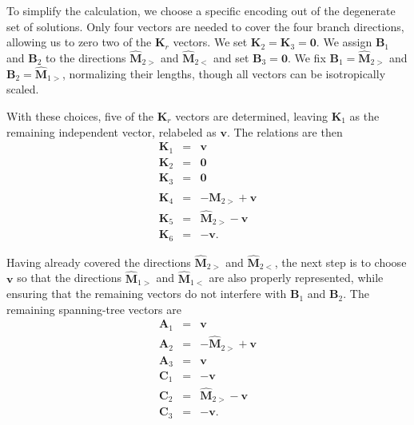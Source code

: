 \documentclass[%
reprint,
superscriptaddress,
amsmath,amssymb,
aps,
]{revtex4-2}
\begin{document}
\begin{onecolumngrid}
		To simplify the calculation, we choose a specific encoding out of the degenerate set of solutions. Only four vectors are needed to cover the four branch directions, allowing us to zero two of the $\mathbf{K}_r$ vectors. We set $\mathbf{K}_2 = \mathbf{K}_3 = \mathbf{0}$. We assign $\mathbf{B}_1$ and $\mathbf{B}_2$ to the directions $\hat{\mathbf{M}}_{2>}$ and $\hat{\mathbf{M}}_{2<}$ and set $\mathbf{B}_3 = \mathbf{0}$. We fix $\mathbf{B}_1 = \hat{\mathbf{M}}_{2>}$ and $\mathbf{B}_2 = \hat{\mathbf{M}}_{1>}$, normalizing their lengths, though all vectors can be isotropically scaled.
		
		With these choices, five of the $\mathbf{K}_r$ vectors are determined, leaving $\mathbf{K}_1$ as the remaining independent vector, relabeled as $\mathbf{v}$. The relations are then
		\begin{eqnarray}
			\mathbf{K}_1 &=& \mathbf{v} \nonumber \\
			\mathbf{K}_2 &=& \mathbf{0} \nonumber \\
			\mathbf{K}_3 &=& \mathbf{0} \nonumber \\
			\mathbf{K}_4 &=&  -\hat{\mathbf{M}}_{2>} + \mathbf{v} \nonumber \\
			\mathbf{K}_5 &=& \hat{\mathbf{M}}_{2>} - \mathbf{v} \nonumber \\
			\mathbf{K}_6 &=& -\mathbf{v}. \nonumber 
		\end{eqnarray}
		
		Having already covered the directions $\hat{\mathbf{M}}_{2>}$ and $\hat{\mathbf{M}}_{2<}$, the next step is to choose $\mathbf{v}$ so that the directions $\hat{\mathbf{M}}_{1>}$ and $\hat{\mathbf{M}}_{1<}$ are also properly represented, while ensuring that the remaining vectors do not interfere with $\mathbf{B}_1$ and $\mathbf{B}_2$.  The remaining spanning-tree vectors are
		\begin{eqnarray}
			\mathbf{A}_1 &=& \mathbf{v} \label{eqA1} \\
			\mathbf{A}_2 &=& -\hat{\mathbf{M}}_{2>} + \mathbf{v}  \label{eqA2} \\
			\mathbf{A}_3 &=& \mathbf{v}  \label{eqA3} \\
			\mathbf{C}_1 &=& -\mathbf{v} \nonumber \\
			\mathbf{C}_2 &=& \hat{\mathbf{M}}_{2>} - \mathbf{v} \nonumber \\
			\mathbf{C}_3 &=& -\mathbf{v} \nonumber.
		\end{eqnarray}
		

\end{onecolumngrid}
\end{document}
